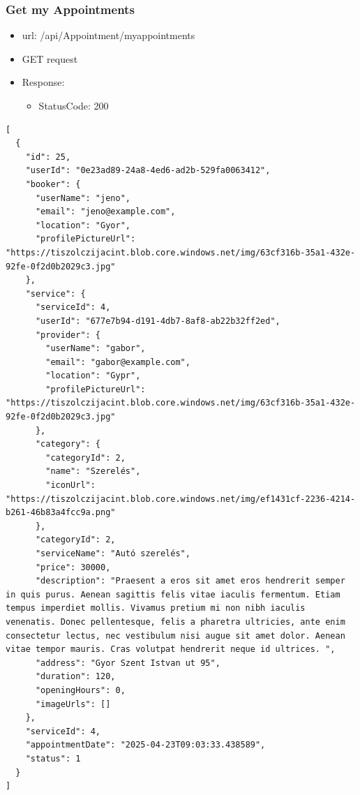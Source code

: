 \documentclass[11pt]{article}
\begin{document}
\subsubsection{Get my Appointments}
\label{sec:org03ce3ae}
\begin{itemize}
\item url: /api/Appointment/myappointments
\item GET request
\item Response:
\begin{itemize}
\item StatusCode: 200
\end{itemize}
\end{itemize}
\begin{verbatim}
[
  {
    "id": 25,
    "userId": "0e23ad89-24a8-4ed6-ad2b-529fa0063412",
    "booker": {
      "userName": "jeno",
      "email": "jeno@example.com",
      "location": "Gyor",
      "profilePictureUrl": "https://tiszolczijacint.blob.core.windows.net/img/63cf316b-35a1-432e-92fe-0f2d0b2029c3.jpg"
    },
    "service": {
      "serviceId": 4,
      "userId": "677e7b94-d191-4db7-8af8-ab22b32ff2ed",
      "provider": {
        "userName": "gabor",
        "email": "gabor@example.com",
        "location": "Gypr",
        "profilePictureUrl": "https://tiszolczijacint.blob.core.windows.net/img/63cf316b-35a1-432e-92fe-0f2d0b2029c3.jpg"
      },
      "category": {
        "categoryId": 2,
        "name": "Szerelés",
        "iconUrl": "https://tiszolczijacint.blob.core.windows.net/img/ef1431cf-2236-4214-b261-46b83a4fcc9a.png"
      },
      "categoryId": 2,
      "serviceName": "Autó szerelés",
      "price": 30000,
      "description": "Praesent a eros sit amet eros hendrerit semper in quis purus. Aenean sagittis felis vitae iaculis fermentum. Etiam tempus imperdiet mollis. Vivamus pretium mi non nibh iaculis venenatis. Donec pellentesque, felis a pharetra ultricies, ante enim consectetur lectus, nec vestibulum nisi augue sit amet dolor. Aenean vitae tempor mauris. Cras volutpat hendrerit neque id ultrices. ",
      "address": "Gyor Szent Istvan ut 95",
      "duration": 120,
      "openingHours": 0,
      "imageUrls": []
    },
    "serviceId": 4,
    "appointmentDate": "2025-04-23T09:03:33.438589",
    "status": 1
  }
]
\end{verbatim}
\end{document}
